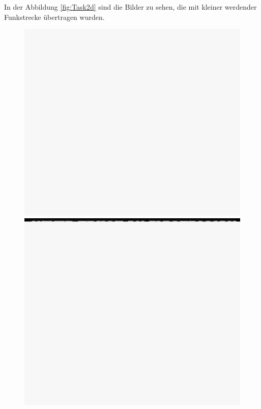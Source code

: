In der Abbildung \ref{fig:Task2d} sind die Bilder zu sehen, die mit kleiner werdender Funkstrecke übertragen wurden.
\begin{figure}[H]
    \begin{minipage}{0.45\textwidth}
            \centering
            \includegraphics[width=\linewidth]{Pictures/grosserAbstand.jpg}
        \end{minipage}
        \hfill
        \begin{minipage}{0.45\textwidth}
            \centering
            \includegraphics[width=\linewidth]{Pictures/wenigergrosserabstand.jpg}
        \end{minipage}


\end{figure}
